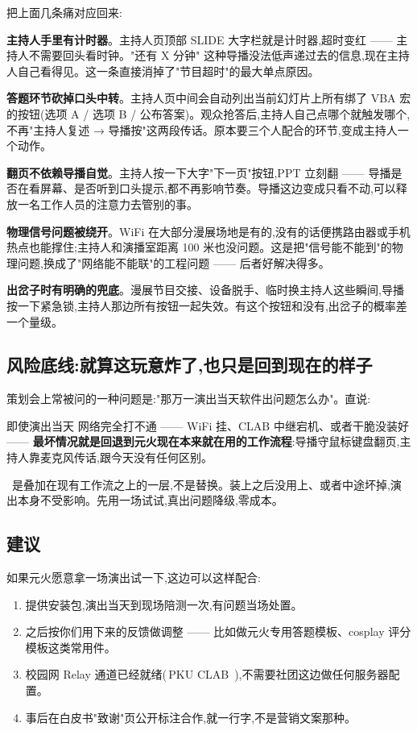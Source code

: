 把上面几条痛对应回来:

\textbf{主持人手里有计时器}。主持人页顶部 SLIDE 大字栏就是计时器,超时变红 —— 主持人不需要回头看时钟。"还有 X 分钟" 这种导播没法低声递过去的信息,现在主持人自己看得见。这一条直接消掉了"节目超时"的最大单点原因。

\textbf{答题环节砍掉口头中转}。主持人页中间会自动列出当前幻灯片上所有绑了 VBA 宏的按钮(选项 A / 选项 B / 公布答案)。观众抢答后,主持人自己点哪个就触发哪个,不再"主持人复述 → 导播按"这两段传话。原本要三个人配合的环节,变成主持人一个动作。

\textbf{翻页不依赖导播自觉}。主持人按一下大字"下一页"按钮,PPT 立刻翻 —— 导播是否在看屏幕、是否听到口头提示,都不再影响节奏。导播这边变成只看不动,可以释放一名工作人员的注意力去管别的事。

\textbf{物理信号问题被绕开}。WiFi 在大部分漫展场地是有的,没有的话便携路由器或手机热点也能撑住;主持人和演播室距离 100 米也没问题。这是把"信号能不能到"的物理问题,换成了"网络能不能联"的工程问题 —— 后者好解决得多。

\textbf{出岔子时有明确的兜底}。漫展节目交接、设备脱手、临时换主持人这些瞬间,导播按一下紧急锁,主持人那边所有按钮一起失效。有这个按钮和没有,出岔子的概率差一个量级。

\subsection*{风险底线:就算这玩意炸了,也只是回到现在的样子}

策划会上常被问的一种问题是:"那万一演出当天软件出问题怎么办"。直说:

即使演出当天\,\app\,网络完全打不通 —— WiFi 挂、CLAB 中继宕机、或者干脆没装好 —— \textbf{最坏情况就是回退到元火现在本来就在用的工作流程}:导播守鼠标键盘翻页,主持人靠麦克风传话,跟今天没有任何区别。

\app\ 是叠加在现有工作流之上的一层,不是替换。装上之后没用上、或者中途坏掉,演出本身不受影响。先用一场试试,真出问题降级,零成本。

\subsection*{建议}

如果元火愿意拿一场演出试一下,这边可以这样配合:

\begin{enumerate}
  \item 提供安装包,演出当天到现场陪测一次,有问题当场处置。
  \item 之后按你们用下来的反馈做调整 —— 比如做元火专用答题模板、cosplay 评分模板这类常用件。
  \item 校园网 Relay 通道已经就绪(\,PKU CLAB \,),不需要社团这边做任何服务器配置。
  \item 事后在白皮书"致谢"页公开标注合作,就一行字,不是营销文案那种。
\end{enumerate}
